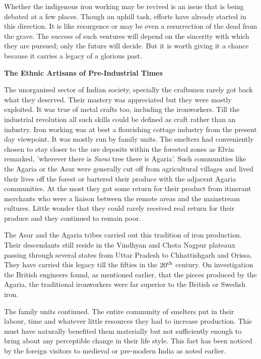 Whether the indigenous iron working may be revived is an issue that is being debated at a few places. Though an uphill task, efforts have already started in this direction. It is like resurgence or may be even a resurrection of the dead from the grave. The success of such ventures will depend on the sincerity with which they are pursued; only the future will decide. But it is worth giving it a chance because it carries a legacy of a glorious past.

\noindent \textbf{\large The Ethnic Artisans of Pre-Industrial Times}

The unorganised sector of Indian society, specially the craftsmen rarely got back what they deserved. Their mastery was appreciated but they were mostly exploited. It was true of metal crafts too, including the ironworkers. Till the industrial revolution all such skills could be defined as craft rather than an industry. Iron working was at best a flourishing cottage industry from the present day viewpoint. It was mostly run by family units. The smelters had conveniently chosen to stay closer to the ore deposits within the forested zones as Elvin remarked, 'wherever there is {\it Sarai} tree there is Agaria'. Such communities like the Agaria or the Asur were generally cut off from agricultural villages and lived their lives off the forest or bartered their produce with the adjacent Agaria communities. At the most they got some return for their product from itinerant merchants who were a liaison between the remote areas and the mainstream cultures. Little wonder that they could rarely received real return for their produce and they continued to remain poor. 

The Asur and the Agaria tribes carried out this tradition of iron production. Their descendants still reside in the Vindhyan and Chota Nagpur plateaux passing through several states from Uttar Pradesh to Chhattishgarh and Orissa. They have carried this legacy till the fifties in the $20^{\rm th}$ century. On investigation the British engineers found, as mentioned earlier, that the pieces produced by the Agaria, the traditional ironworkers were far superior to the British or Swedish iron.

The family units continued. The entire community of smelters put in their labour, time and whatever little resources they had to increase production. This must have naturally benefited them materially but not sufficiently enough to bring about any perceptible change in their life style. This fact has been noticed by the foreign visitors to medieval or pre-modern India as noted earlier.

